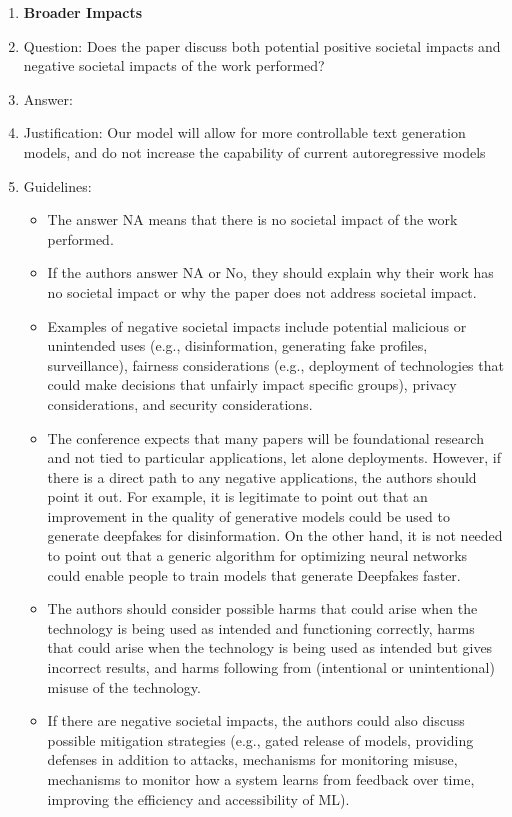 \documentclass{article} %
\begin{document}
{\begin{appendices}
\begin{enumerate}
\item {\bf Broader Impacts}
    \item[] Question: Does the paper discuss both potential positive societal impacts and negative societal impacts of the work performed?
    \item[] Answer: \answerYes{} %
    \item[] Justification: Our model will allow for more controllable text generation models, and do not increase the capability of current autoregressive models%
    \item[] Guidelines:
    \begin{itemize}
        \item The answer NA means that there is no societal impact of the work performed.
        \item If the authors answer NA or No, they should explain why their work has no societal impact or why the paper does not address societal impact.
        \item Examples of negative societal impacts include potential malicious or unintended uses (e.g., disinformation, generating fake profiles, surveillance), fairness considerations (e.g., deployment of technologies that could make decisions that unfairly impact specific groups), privacy considerations, and security considerations.
        \item The conference expects that many papers will be foundational research and not tied to particular applications, let alone deployments. However, if there is a direct path to any negative applications, the authors should point it out. For example, it is legitimate to point out that an improvement in the quality of generative models could be used to generate deepfakes for disinformation. On the other hand, it is not needed to point out that a generic algorithm for optimizing neural networks could enable people to train models that generate Deepfakes faster.
        \item The authors should consider possible harms that could arise when the technology is being used as intended and functioning correctly, harms that could arise when the technology is being used as intended but gives incorrect results, and harms following from (intentional or unintentional) misuse of the technology.
        \item If there are negative societal impacts, the authors could also discuss possible mitigation strategies (e.g., gated release of models, providing defenses in addition to attacks, mechanisms for monitoring misuse, mechanisms to monitor how a system learns from feedback over time, improving the efficiency and accessibility of ML).
    \end{itemize}
    

\end{enumerate}
\end{appendices}}
\end{document}
